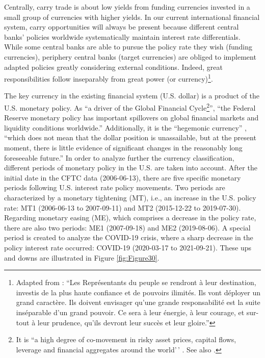 \documentclass[a4paper, twoside]{templates/ociamthesis}
\begin{document}
Centrally, carry trade is about low yields from funding currencies invested in a small group of currencies with higher yields. In our current international financial system, carry opportunities will always be present because different central banks' policies worldwide systematically maintain interest rate differentials. While some central banks are able to pursue the policy rate they wish (funding currencies), periphery central banks (target currencies) are obliged to implement adapted policies greatly considering external conditions. Indeed, great responsibilities follow inseparably from great power (or currency)\footnote{Adapted from \textcite{conventionnationaleparis1793}: ``Les Représentants du peuple se rendront à leur destination, investis de la plus haute confiance et de pouvoirs ilimités. Ils vont déployer un grand caractère. Ils doivent envisager qu'une grande responsabilité est la suite inséparable d'un grand pouvoir. Ce sera à leur énergie, à leur courage, et sur-tout à leur prudence, qu'ils devront leur succès et leur gloire.''}.

The key currency in the existing financial system (U.S. dollar) is a product of the U.S. monetary policy. As ``a driver of the Global Financial Cycle\footnote{It is ``a high degree of co-movement in risky asset prices, capital flows, leverage and financial aggregates around the world'\,' \autocite[ 2]{miranda-agrippino2021}. See also \textcite{rey2015}.}'', ``the Federal Reserve monetary policy has important spillovers on global financial markets and liquidity conditions worldwide.'' \autocite[ 21]{miranda-agrippino2021} Additionally, it is the ``hegemonic currency'' \autocite{fields2013}, ``which does not mean that the dollar position is unassailable, but at the present moment, there is little evidence of significant changes in the reasonably long foreseeable future.'' \autocite[ 547]{vernengo2021} In order to analyze further the currency classification, different periods of monetary policy in the U.S. are taken into account. After the initial date in the CFTC data (2006-06-13), there are five specific monetary periods following U.S. interest rate policy movements. Two periods are characterized by a monetary tightening (MT), i.e., an increase in the U.S. policy rate: MT1 (2006-06-13 to 2007-09-11) and MT2 (2015-12-22 to 2019-07-30). Regarding monetary easing (ME), which comprises a decrease in the policy rate, there are also two periods: ME1 (2007-09-18) and ME2 (2019-08-06). A special period is created to analyze the COVID-19 crisis, where a sharp decrease in the policy interest rate occurred: COVID-19 (2020-03-17 to 2021-09-21). These ups and downs are illustrated in Figure \ref{fig:Figure30}.
\end{document}
